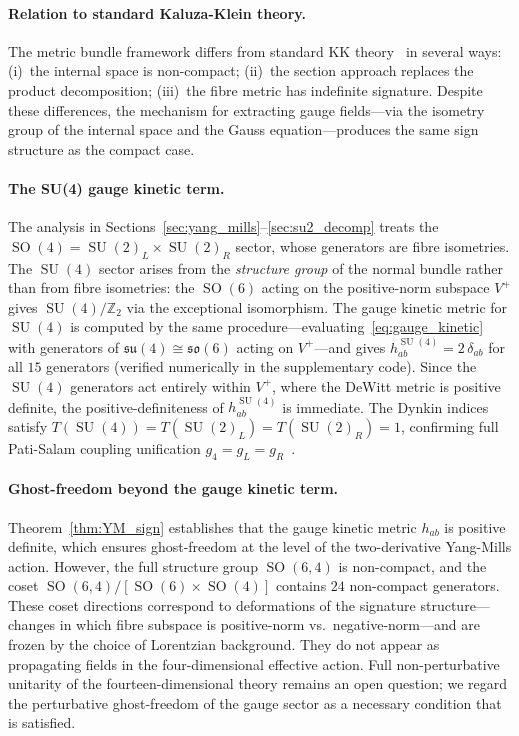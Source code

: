 \documentclass[12pt,a4paper]{article}
\theoremstyle{definition}
\newcommand{\SO}{\operatorname{SO}}
\newcommand{\SU}{\operatorname{SU}}
\newcommand{\Z}{\mathbb{Z}}
\begin{document}
\paragraph{Relation to standard Kaluza-Klein theory.}
The metric bundle framework differs from standard KK theory~\cite{Bailin1987} in several ways:
(i)~the internal space is non-compact;
(ii)~the section approach replaces the product decomposition;
(iii)~the fibre metric has indefinite signature.
Despite these differences, the mechanism for extracting gauge fields---via the isometry group of the internal space and the Gauss equation---produces the same sign structure as the compact case.

\paragraph{The SU(4) gauge kinetic term.}
The analysis in Sections~\ref{sec:yang_mills}--\ref{sec:su2_decomp} treats the $\SO(4) = \SU(2)_L \times \SU(2)_R$ sector, whose generators are fibre isometries.
The $\SU(4)$ sector arises from the \emph{structure group} of the normal bundle rather than from fibre isometries: the $\SO(6)$ acting on the positive-norm subspace $V^+$ gives $\SU(4)/\Z_2$ via the exceptional isomorphism.
The gauge kinetic metric for $\SU(4)$ is computed by the same procedure---evaluating~\eqref{eq:gauge_kinetic} with generators of $\mathfrak{su}(4) \cong \mathfrak{so}(6)$ acting on $V^+$---and gives $h^{\SU(4)}_{ab} = 2\,\delta_{ab}$ for all $15$ generators (verified numerically in the supplementary code).
Since the $\SU(4)$ generators act entirely within $V^+$, where the DeWitt metric is positive definite, the positive-definiteness of $h^{\SU(4)}_{ab}$ is immediate.
The Dynkin indices satisfy $T(\SU(4)) = T(\SU(2)_L) = T(\SU(2)_R) = 1$, confirming full Pati-Salam coupling unification $g_4 = g_L = g_R$~\cite{Paper1}.

\paragraph{Ghost-freedom beyond the gauge kinetic term.}
Theorem~\ref{thm:YM_sign} establishes that the gauge kinetic metric $h_{ab}$ is positive definite, which ensures ghost-freedom at the level of the two-derivative Yang-Mills action.
However, the full structure group $\SO(6,4)$ is non-compact, and the coset $\SO(6,4)/[\SO(6) \times \SO(4)]$ contains $24$ non-compact generators.
These coset directions correspond to deformations of the signature structure---changes in which fibre subspace is positive-norm vs.\ negative-norm---and are frozen by the choice of Lorentzian background.
They do not appear as propagating fields in the four-dimensional effective action.
Full non-perturbative unitarity of the fourteen-dimensional theory remains an open question; we regard the perturbative ghost-freedom of the gauge sector as a necessary condition that is satisfied.
\end{document}

